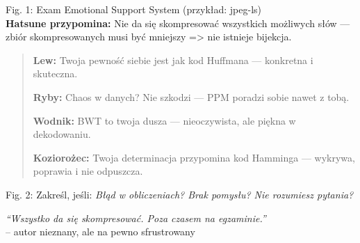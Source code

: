\documentclass{notatki}
\begin{document}
\begin{multicols}{2}
\begin{multicols}{2}
\begin{center}
        \begin{center}
            Fig. 1: Exam Emotional Support System (przykład: jpeg-ls) \\
            \textbf{Hatsune przypomina:} Nie da się skompresować wszystkich możliwych słów — zbiór skompresowanych musi być mniejszy => nie istnieje bijekcja.

        \end{center}
    \end{center}
    \columnbreak
    \begin{quote}
        \textbf{Lew:} Twoja pewność siebie jest jak kod Huffmana — konkretna i skuteczna.  
        
        \textbf{Ryby:} Chaos w danych? Nie szkodzi — PPM poradzi sobie nawet z tobą.  
        
        \textbf{Wodnik:} BWT to twoja dusza — nieoczywista, ale piękna w dekodowaniu.  
        
        \textbf{Koziorożec:} Twoja determinacja przypomina kod Hamminga — wykrywa, poprawia i nie odpuszcza.  
    \end{quote}

    \end{multicols}

    \begin{center}
        \fbox{\phantom{\rule{1em}{1em}}}
        \fbox{\phantom{\rule{1em}{1em}}}
        \fbox{\phantom{\rule{1em}{1em}}}
        \fbox{\phantom{\rule{1em}{1em}}}
        \fbox{\phantom{\rule{1em}{1em}}}
        \end{center}
        \vspace{-0.8em}
        \begin{center}
        \footnotesize Fig. 2: Zakreśl, jeśli: \textit{Błąd w obliczeniach? Brak pomysłu? Nie rozumiesz pytania?}
        \end{center}
        \begin{center}
            \vspace{-0.5em}
            \textit{“Wszystko da się skompresować. Poza czasem na egzaminie.”} \\
            -- autor nieznany, ale na pewno sfrustrowany
        \end{center}
\end{multicols}
\end{document}
